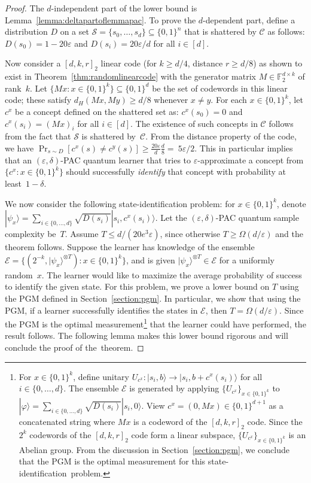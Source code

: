\documentclass[twoside,11pt]{article}
\newcommand{\eps}{\varepsilon}
\newcommand{\ket}[1]{|#1\rangle}
\newcommand{\F}{\ensuremath{\mathbb{F}}}
\newcommand{\E}{\mathcal{E}}
\newcommand{\Sh}{\ensuremath{\mathcal{S}}}
\newcommand{\ph}{\ensuremath{\varphi}}
\def\01{\{0,1\}}
\newcommand{\C}{\ensuremath{\mathscr{C}}}
\begin{document}
\begin{proof}
	The $d$-independent part of the lower bound is Lemma~\ref{lemma:deltapartoflemmapac}. To prove the $d$-dependent part, define a distribution $D$ on a set $\Sh=\{s_0,\ldots,s_d\} \subseteq \01^n$ that is shattered by $\C$ as follows: $D(s_0)=1-20\eps$ and $D(s_i)=20\eps/d$ for all $i\in [d]$. 
	
	Now consider a $[d,k,r]_2$ linear code (for $k\geq d/4$, distance $r\geq d/8$) as shown to exist in Theorem~\ref{thm:randomlinearcode} with the generator matrix $M\in \F_2^{d\times k}$ of rank~$k$. Let $\{Mx:x\in \01^k\} \subseteq \01^{d}$ be the set of codewords in this linear code; these satisfy $d_H(Mx,My)\geq d/8$ whenever $x\neq y$. For each $x\in \01^k$, let $c^x$ be a concept defined on the shattered set as: $c^x(s_0)=0$ and $c^x(s_i)=(Mx)_i$ for all $i\in [d]$. The existence of such concepts in $\C$ follows from the fact that $\Sh$ is shattered by~$\C$. From the distance property of the code, we have $\Pr_{s\sim D}[c^x(s)\neq c^y(s)]\geq \frac{20\eps}{d} \frac{d}{8}=~5\eps/2$. This in particular implies that an $(\eps,\delta)$-PAC quantum learner that tries to $\eps$-approximate a concept from $\{c^x:x\in\01^k\}$ should successfully \emph{identify} that concept with probability at least~$1-\delta$.  
	
	We now consider the following state-identification problem: for $x\in \01^k$, denote $\ket{\psi_x}=\sum_{i\in \{0,\ldots, d\}} \sqrt{D(s_i)} \ket{s_i, c^x(s_i)}$. Let the $(\eps,\delta)$-PAC quantum sample complexity be~$T$. Assume $T\leq d/(20e^3 \eps)$, since otherwise $T\geq \Omega(d/\eps)$ and the theorem follows. Suppose the learner has knowledge of the ensemble $\E=\{(2^{-k},\ket{\psi_x}^{\otimes T}):x\in \01^k\}$, and is given $\ket{\psi_x}^{\otimes T} \in \E$ for a uniformly random~$x$. The learner would like to maximize the average probability of success to identify the given state. For this problem, we prove a lower bound on $T$ using the PGM defined in Section~\ref{section:pgm}. In particular, we show that using the PGM, if a learner successfully identifies the states in $\E$, then $T=\Omega(d/\eps)$. Since the PGM is the optimal measurement\footnote{For $x\in\01^k$, define unitary $U_{c^x}:  \ket{s_i,b}\rightarrow \ket{s_i,b+c^x(s_i)}$ for all $i\in \{0,\ldots,d\}$. The ensemble $\E$ is generated by applying $\{U_{c^x}\}_{x\in \01^k}$ to $\ket{\ph}=\sum_{i\in \{0,\ldots, d\}} \sqrt{D(s_i)} \ket{s_i,0}$. View $c^x=(0,Mx) \in \01^{d+1}$ as a concatenated string where $Mx$ is a codeword of the $[d,k,r]_2$ code. Since the $2^k$ codewords of the $[d,k,r]_2$ code form a linear subspace, $\{U_{c^x}\}_{x\in \01^k}$ is an Abelian group. From the discussion in Section~\ref{section:pgm}, we conclude that the PGM is the optimal measurement for this state-identification~problem.} that the learner could have performed, the result follows. The following lemma makes this lower bound rigorous and will conclude the proof of the~theorem. 
	

\end{proof}
\end{document}
